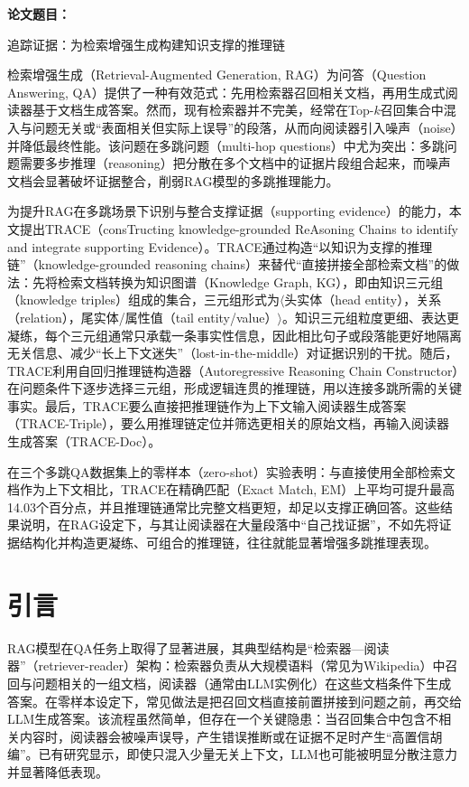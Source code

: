 \noindent\textbf{论文题目：}\parbox[t]{0.86\linewidth}{追踪证据：为检索增强生成构建知识支撑的推理链}


检索增强生成（Retrieval-Augmented Generation, RAG）为问答（Question Answering, QA）提供了一种有效范式：先用检索器召回相关文档，再用生成式阅读器基于文档生成答案。然而，现有检索器并不完美，经常在Top-$k$召回集合中混入与问题无关或“表面相关但实际上误导”的段落，从而向阅读器引入噪声（noise）并降低最终性能。该问题在多跳问题（multi-hop questions）中尤为突出：多跳问题需要多步推理（reasoning）把分散在多个文档中的证据片段组合起来，而噪声文档会显著破坏证据整合，削弱RAG模型的多跳推理能力。

为提升RAG在多跳场景下识别与整合支撑证据（supporting evidence）的能力，本文提出TRACE（consTructing knowledge-grounded ReAsoning Chains to identify and integrate supporting Evidence）。TRACE通过构造“以知识为支撑的推理链”（knowledge-grounded reasoning chains）来替代“直接拼接全部检索文档”的做法：先将检索文档转换为知识图谱（Knowledge Graph, KG），即由知识三元组（knowledge triples）组成的集合，三元组形式为$\langle$头实体（head entity），关系（relation），尾实体/属性值（tail entity/value）$\rangle$。知识三元组粒度更细、表达更凝练，每个三元组通常只承载一条事实性信息，因此相比句子或段落能更好地隔离无关信息、减少“长上下文迷失”（lost-in-the-middle）对证据识别的干扰。随后，TRACE利用自回归推理链构造器（Autoregressive Reasoning Chain Constructor）在问题条件下逐步选择三元组，形成逻辑连贯的推理链，用以连接多跳所需的关键事实。最后，TRACE要么直接把推理链作为上下文输入阅读器生成答案（TRACE-Triple），要么用推理链定位并筛选更相关的原始文档，再输入阅读器生成答案（TRACE-Doc）。

在三个多跳QA数据集上的零样本（zero-shot）实验表明：与直接使用全部检索文档作为上下文相比，TRACE在精确匹配（Exact Match, EM）上平均可提升最高14.03个百分点，并且推理链通常比完整文档更短，却足以支撑正确回答。这些结果说明，在RAG设定下，与其让阅读器在大量段落中“自己找证据”，不如先将证据结构化并构造更凝练、可组合的推理链，往往就能显著增强多跳推理表现。

\section{引言}
RAG模型在QA任务上取得了显著进展，其典型结构是“检索器—阅读器”（retriever-reader）架构：检索器负责从大规模语料（常见为Wikipedia）中召回与问题相关的一组文档，阅读器（通常由LLM实例化）在这些文档条件下生成答案。在零样本设定下，常见做法是把召回文档直接前置拼接到问题之前，再交给LLM生成答案。该流程虽然简单，但存在一个关键隐患：当召回集合中包含不相关内容时，阅读器会被噪声误导，产生错误推断或在证据不足时产生“高置信胡编”。已有研究显示，即使只混入少量无关上下文，LLM也可能被明显分散注意力并显著降低表现。

